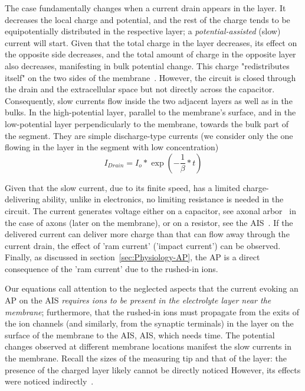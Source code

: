 The case fundamentally changes when a current drain appears in the
layer. It decreases the local charge and potential, and the rest of
the charge tends to be equipotentially distributed in the respective
layer; a \emph{potential-assisted} (slow) current will start. Given
that the total charge in the layer decreases, its effect on the opposite
side decreases, and the total amount of charge in the opposite layer
also decreases, manifesting in bulk potential change. This charge
"redistributes itself" on the two sides of the membrane~\cite{KochBiophysics:1999}.
However, the circuit is closed through the drain and the extracellular
space but not directly across the capacitor. Consequently,
slow currents flow inside the two adjacent layers as well as in the bulks. In the high-potential
layer, parallel to the membrane's surface, and in the low-potential
layer perpendicularly to the membrane, towards the bulk part of the
segment. They are simple discharge-type currents (we consider only
the one flowing in the layer in the segment with low concentration)
\begin{equation}
I_{Drain}=I_{o}*\exp(-\frac{1}{\beta}*t)\label{eq:I_Drain}
\end{equation}

Given that the slow current, due to its finite speed, has a limited
charge-delivering ability, unlike in electronics, no limiting resistance
is needed in the circuit. The current generates voltage either on
a capacitor, see axonal arbor~\cite{NeuronalArborisation:2021,NeuritsArbor:2022}
in the case of axons (later on the membrane), or on a resistor, see
the \gls{AIS}~\cite{AxonInitialSegmentStructure:2018}. If the delivered
current can deliver more charge than that can flow away through the
current drain, the effect of 'ram current' ('impact current') can
be observed. Finally, as discussed in section~\ref{sec:Physiology-AP},
the \gls{AP} is a direct consequence of the 'ram current' due to
the rushed-in ions. 

Our equations call attention to the neglected aspects that the current
evoking an \gls{AP} on the
\gls{AIS} \emph{requires ions to be present
in the electrolyte layer near the membrane}; furthermore, that the
rushed-in ions must propagate from the exits of the ion channels (and
similarly, from the synaptic terminals) in the layer on the surface
of the membrane to the \gls{AIS},
AIS, which needs time. The potential
changes observed at different membrane locations manifest the slow
currents in the membrane. Recall the sizes of the measuring tip and
that of the layer: the presence of the charged layer likely cannot
be directly noticed
However, its effects were noticed indirectly~\cite{MechanicalWaves:2015}.

